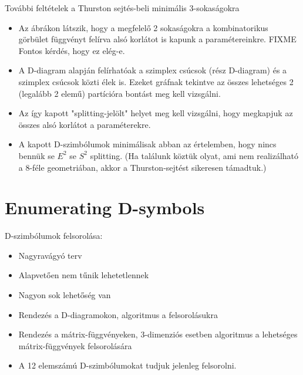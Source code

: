 \begin{frame}
  További feltételek a Thurston sejtés-beli minimális 3-sokaságokra
  \begin{itemize}
    \item Az ábrákon látszik, hogy a megfelelő 2 sokaságokra a kombinatorikus
      görbület függvényt felírva alsó korlátot is kapunk a paramétereinkre.
      FIXME Fontos kérdés, hogy ez elég-e.
    \item A D-diagram alapján felírhatóak a szimplex csúcsok (rész D-diagram) és
      a szimplex csúcsok közti élek is. Ezeket gráfnak tekintve az összes
      lehetséges 2 (legalább 2 elemű) partícióra bontást meg kell vizsgálni.
    \item Az így kapott "splitting-jelölt" helyet meg kell vizsgálni, hogy
      megkapjuk az összes alsó korlátot a paraméterekre.
    \item A kapott D-szimbólumok minimálisak abban az értelemben, hogy nincs
      bennük se $E^2$ se $S^2$ splitting. (Ha találunk köztük olyat, ami nem
      realizálható a 8-féle geometriában, akkor a Thurston-sejtést sikeresen
      támadtuk.)
  \end{itemize}
\end{frame}


\section{Enumerating D-symbols}
\begin{frame}
  D-szimbólumok felsorolása:
  \begin{itemize}
    \item Nagyravágyó terv
    \item Alapvetően nem tűnik lehetetlennek
    \item Nagyon sok lehetőség van
    \item Rendezés a D-diagramokon, algoritmus a felsorolásukra
    \item Rendezés a mátrix-függvényeken, $3$-dimenziós esetben algoritmus a
      lehetséges mátrix-függvények felsorolására 
    \item A 12 elemszámú D-szimbólumokat tudjuk jelenleg felsorolni.
  \end{itemize}
\end{frame}

